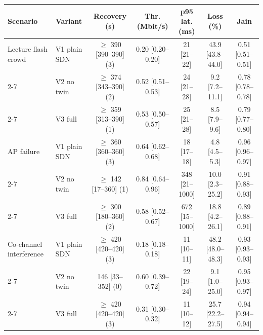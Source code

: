 \begin{tabular}{|l|l|c|c|c|c|c|}
\hline
Scenario & Variant & Recovery (s) & Thr. (Mbit/s) & p95 lat. (ms) & Loss (\%) & Jain \\
\hline
Lecture flash crowd & V1 plain SDN & $\geq$ 390 [390--390] (3) & 0.20 [0.20--0.20] & 21 [21--22] & 43.9 [43.8--44.0] & 0.51 [0.51--0.51] \\
\cline{2-7}
 & V2 no twin & $\geq$ 374 [343--390] (2) & 0.52 [0.51--0.53] & 24 [21--28] & 9.2 [7.2--11.1] & 0.78 [0.78--0.78] \\
\cline{2-7}
 & V3 full & $\geq$ 359 [313--390] (1) & 0.53 [0.50--0.57] & 25 [21--28] & 8.5 [7.9--9.6] & 0.79 [0.77--0.80] \\
\hline
AP failure & V1 plain SDN & $\geq$ 360 [360--360] (3) & 0.64 [0.62--0.68] & 18 [17--18] & 4.8 [4.5--5.3] & 0.96 [0.96--0.97] \\
\cline{2-7}
 & V2 no twin & $\geq$ 142 [17--360] (1) & 0.84 [0.64--0.96] & 348 [21--1000] & 10.0 [2.3--25.2] & 0.91 [0.88--0.93] \\
\cline{2-7}
 & V3 full & $\geq$ 300 [180--360] (2) & 0.58 [0.52--0.67] & 672 [15--1000] & 18.8 [4.2--26.1] & 0.89 [0.88--0.91] \\
\hline
Co-channel interference & V1 plain SDN & $\geq$ 420 [420--420] (3) & 0.18 [0.18--0.18] & 11 [10--11] & 48.2 [48.0--48.3] & 0.93 [0.93--0.93] \\
\cline{2-7}
 & V2 no twin & 146 [33--352] (0) & 0.60 [0.39--0.72] & 22 [19--24] & 9.1 [1.0--25.0] & 0.95 [0.93--0.97] \\
\cline{2-7}
 & V3 full & $\geq$ 420 [420--420] (3) & 0.31 [0.30--0.32] & 11 [10--12] & 25.7 [22.2--27.5] & 0.94 [0.94--0.94] \\
\hline
\end{tabular}
